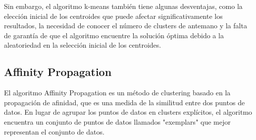 Sin embargo, el algoritmo k-means también tiene algunas desventajas, como la elección inicial de los centroides que puede afectar significativamente los resultados, la necesidad de conocer el número de clusters de antemano y la falta de garantía de que el algoritmo encuentre la solución óptima debido a la aleatoriedad en la selección inicial de los centroides.

\subsection{Affinity Propagation}
El algoritmo Affinity Propagation es un método de clustering basado en la propagación de afinidad, que es una medida de la similitud entre dos puntos de datos. En lugar de agrupar los puntos de datos en clusters explícitos, el algoritmo encuentra un conjunto de puntos de datos llamados "exemplars" que mejor representan el conjunto de datos.


